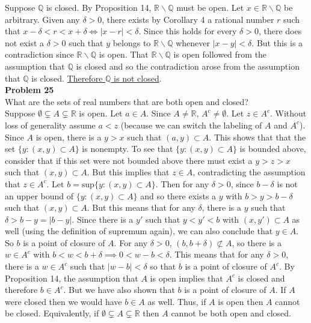 \documentclass[a4paper]{article}
\begin{document}
Suppose $\mathbb{Q}$ is closed. By Proposition 14, $\mathbb{R}\backslash \mathbb{Q}$ must be open. Let $x \in \mathbb{R}\backslash \mathbb{Q}$ be arbitrary. Given any $\delta >0$, there exists by Corollary 4 a rational number $r$ such that $x-\delta < r < x+\delta \iff |x-r| < \delta$. Since this holds for every $\delta >0$, there does not exist a $\delta>0$ such that $y$ belongs to $\mathbb{R}\backslash \mathbb{Q}$ whenever $|x-y| < \delta$. But this is a contradiction since $\mathbb{R}\backslash \mathbb{Q}$ is open. That $\mathbb{R}\backslash \mathbb{Q}$ is open followed from the assumption that $\mathbb{Q}$ is closed and so the contradiction arose from the assumption that $\mathbb{Q}$ is closed. \underline{Therefore $\mathbb{Q}$ is not closed}.\\


{\bf Problem 25}\\
What are the sets of real numbers that are both open and closed?\\

Suppose $\emptyset \subsetneq A \subsetneq \mathbb{R}$ is open. Let $a \in A$. Since $A\neq \mathbb{R}$, $A^c \neq \emptyset$. Let $z \in A^c$. Without loss of generality assume $a<z$ (because we can switch the labeling of $A$ and $A^c$). Since $A$ is open, there is a $y>x$ such that $(a,y) \subset A$. This shows that that the set $\{y : (x,y) \subset A\}$ is nonempty. To see that $\{y : (x,y) \subset A\}$ is bounded above, consider that if this set were not bounded above there must exist a $y> z > x$ such that $(x,y) \subset A$. But this implies that $z \in A$, contradicting the assumption that $z \in A^c$. Let $b = \text{sup}\{y : (x,y) \subset A\}$. Then for any $\delta >0$, since $b-\delta$ is not an upper bound of $\{y : (x,y) \subset A\}$ and so there exists a $y$ with $b>y>b-\delta$ such that $(x,y) \subset A$. But this means that for any $\delta$, there is a $y$ such that $\delta > b-y = |b-y|$. Since there is a $y'$ such that $y<y'<b$ with $(x,y') \subset A$ as well (using the definition of supremum again), we can also conclude that $y \in A$. So $b$ is a point of closure of $A$. For any $\delta > 0$, $(b,b+\delta) \not\subset A$, so there is a $w \in A^c$ with $b<w<b+\delta \implies 0<w-b<\delta$. This means that for any $\delta >0$, there is a $w \in A^c$ such that $|w-b| < \delta$ so that $b$ is a point of closure of $A^c$. By Proposition 14, the assumption that $A$ is open implies that $A^c$ is closed and therefore $b \in A^c$. But we have also shown that $b$ is a point of closure of $A$. If $A$ were closed then we would have $b \in A$ as well. Thus, if $A$ is open then $A$ cannot be closed. Equivalently, if $\emptyset \subsetneq A \subsetneq \mathbb{R}$ then $A$ cannot be both open and closed. \\
\end{document}
